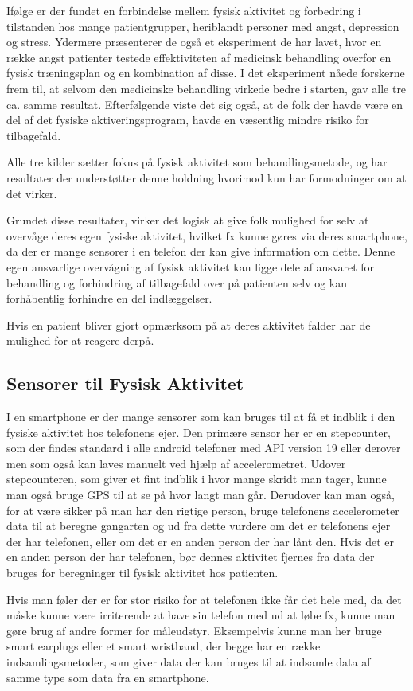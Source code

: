 Ifølge \citet{book:sportPsyc} er der fundet en forbindelse mellem fysisk aktivitet og forbedring i tilstanden hos mange patientgrupper, heriblandt personer med angst, depression og stress.
Ydermere præsenterer de også et eksperiment de har lavet, hvor en række angst patienter testede effektiviteten af medicinsk behandling overfor en fysisk træningsplan og en kombination af disse.
I det eksperiment nåede forskerne frem til, at selvom den medicinske behandling virkede bedre i starten, gav alle tre ca. samme resultat.
Efterfølgende viste det sig også, at de folk der havde være en del af det fysiske aktiveringsprogram, havde en væsentlig mindre risiko for tilbagefald.

Alle tre kilder sætter fokus på fysisk aktivitet som behandlingsmetode, \citet{art:physMental} og \citet{book:sportPsyc} har resultater der understøtter denne holdning hvorimod \citet{misc:healthReports} kun har formodninger om at det virker.

Grundet disse resultater, virker det logisk at give folk mulighed for selv at overvåge deres egen fysiske aktivitet, hvilket fx kunne gøres via deres smartphone, da der er mange sensorer i en telefon der kan give information om dette.
Denne egen ansvarlige overvågning af fysisk aktivitet kan ligge dele af ansvaret for behandling og forhindring af tilbagefald over på patienten selv og kan forhåbentlig forhindre en del indlæggelser.

Hvis en patient bliver gjort opmærksom på at deres aktivitet falder har de mulighed for at reagere derpå.

\subsection{Sensorer til Fysisk Aktivitet}
I en smartphone er der mange sensorer som kan bruges til at få et indblik i den fysiske aktivitet hos telefonens ejer.
Den primære sensor her er en stepcounter, som der findes standard i alle android telefoner med API version 19 eller derover men som også kan laves manuelt ved hjælp af accelerometret.
Udover stepcounteren, som giver et fint indblik i hvor mange skridt man tager, kunne man også bruge GPS til at se på hvor langt man går.
Derudover kan man også, for at være sikker på man har den rigtige person, bruge telefonens accelerometer data til at beregne gangarten \citep{4272626} og ud fra dette vurdere om det er telefonens ejer der har telefonen, eller om det er en anden person der har lånt den.
Hvis det er en anden person der har telefonen, bør dennes aktivitet fjernes fra data der bruges for beregninger til fysisk aktivitet hos patienten.

Hvis man føler der er for stor risiko for at telefonen ikke får det hele med, da det måske kunne være irriterende at have sin telefon med ud at løbe fx, kunne man gøre brug af andre former for måleudstyr.
Eksempelvis kunne man her bruge smart earplugs eller et smart wristband, der begge har en række indsamlingsmetoder, som giver data der kan bruges til at indsamle data af samme type som data fra en smartphone.